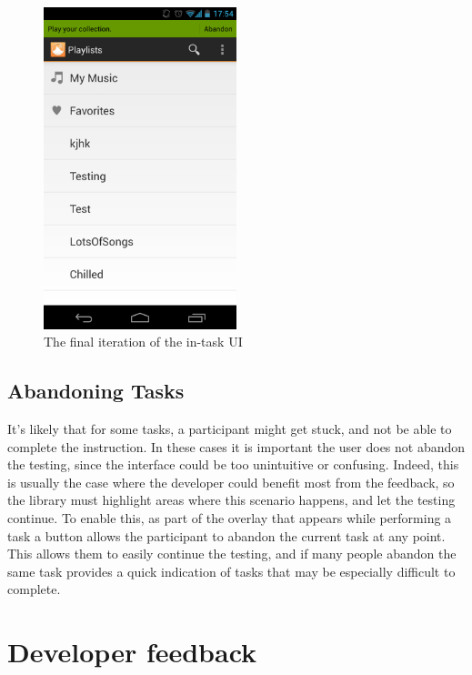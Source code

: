 \begin{figure}[ht]
  \centering
  \includegraphics[width=0.5\textwidth]{images/new-in-task}
  \caption{The final iteration of the in-task UI}
  \label{fig:final-task-overlay}
\end{figure}

\subsection{Abandoning Tasks}

It's likely that for some tasks, a participant might get stuck, and not be able
to complete the instruction. In these cases it is important the user does not abandon 
the testing, since the interface could be too unintuitive or confusing. Indeed, this 
is usually the case
where the developer could benefit most from the feedback, so the library must highlight areas
where this scenario happens, and let the testing continue. To
enable this, as part of the overlay that appears while performing a task a
button allows the participant to abandon the current task at any point. This allows them to easily continue the testing, and if many people abandon the same task provides a quick indication of tasks that may be especially difficult to complete.

\section{Developer feedback}
\label{sec:developer-feedback}

